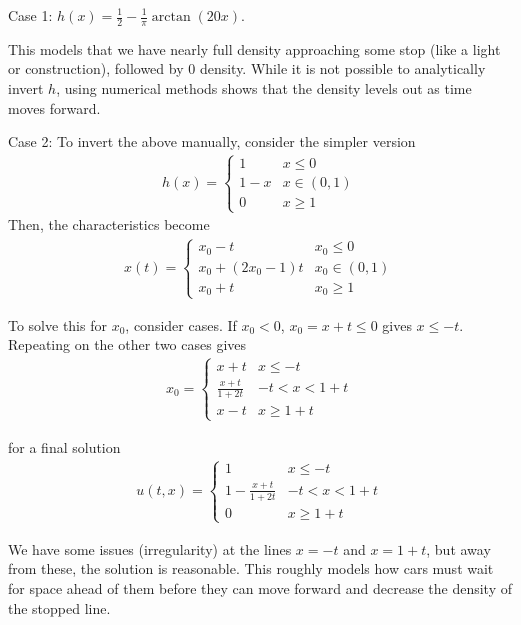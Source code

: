 \documentclass{article}
\begin{document}
	\vspace{0.25cm}
	
	Case 1: $h(x) = \frac{1}{2} - \frac{1}{\pi} \arctan(20x)$. 
	
	This models that we have nearly full density approaching some stop (like a light or construction), followed by $0$ density. While it is not possible to analytically invert $h$, using numerical methods shows that the density levels out as time moves forward. 
	
	\vspace{0.25cm}
	
	Case 2: To invert the above manually, consider the simpler version
	\begin{align*}
		h(x) = \begin{cases}1 & x \leq 0 \\ 1-x & x \in (0,1) \\ 0 & x \geq 1 \end{cases}
	\end{align*}
	Then, the characteristics become 
	\begin{align*}
		x(t) = \begin{cases} x_0 - t & x_0 \leq 0 \\ x_0 + (2x_0 -1)t & x_0 \in(0,1) \\ x_0 + t & x_0 \geq 1 \end{cases}
	\end{align*}
	
	To solve this for $x_0$, consider cases. If $x_0 < 0$, $x_0 = x+t \leq 0$ gives $x \leq -t$. Repeating on the other two cases gives
	\begin{align*}
		x_0 = \begin{cases}x + t & x \leq -t \\
		\frac{x+t}{1+2t} & -t < x < 1+t \\
		x-t & x \geq 1+t\end{cases}
	\end{align*}
	
	for a final solution 
	\begin{align*}
		u(t,x) = \begin{cases} 1 & x \leq -t \\ 1-\frac{x+t}{1+2t} & -t < x < 1+t \\ 0 & x \geq 1+t\end{cases}
	\end{align*}
	
	We have some issues (irregularity) at the lines $x=-t$ and $x=1+t$, but away from these, the solution is reasonable. This roughly models how cars must wait for space ahead of them before they can move forward and decrease the density of the stopped line. 	
	
\end{document}
